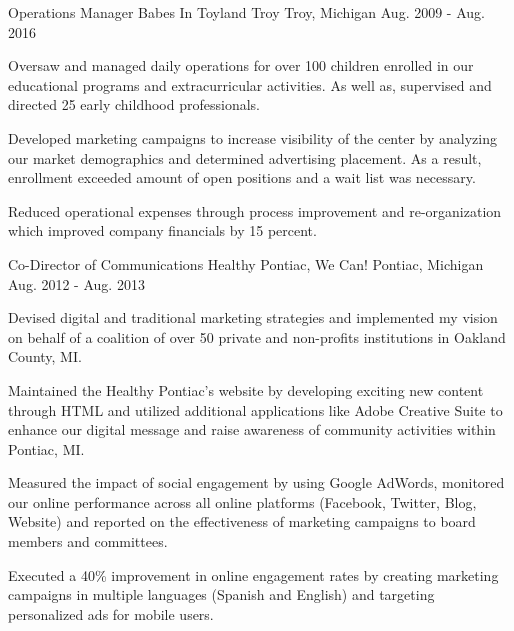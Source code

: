 \begin{cventries}
  \cventry
    {Operations Manager} %
    {Babes In Toyland Troy} %
    {Troy, Michigan} %
    {Aug. 2009 - Aug. 2016} %
    {
      \begin{cvitems} %
        \item {Oversaw and managed daily operations for over 100 children enrolled in our educational programs and extracurricular activities. As well as, supervised and directed 25 early childhood professionals.}
        \item {Developed marketing campaigns to increase visibility of the center by analyzing our market demographics and determined advertising placement. As a result, enrollment exceeded amount of open positions and a wait list was necessary.}
        \item {Reduced operational expenses through process improvement and re-organization which improved company financials by 15 percent.}
      \end{cvitems}
    }

  \cventry
    {Co-Director of Communications} %
    {Healthy Pontiac, We Can!} %
    {Pontiac, Michigan} %
    {Aug. 2012 - Aug. 2013} %
    {
      \begin{cvitems} %
        \item {Devised digital and traditional marketing strategies and implemented my vision on behalf of a coalition of over 50 private and non-profits institutions in Oakland County, MI.}
        \item {Maintained the Healthy Pontiac’s website by developing exciting new content through HTML and utilized additional applications like Adobe Creative Suite to enhance our digital message and raise awareness of community activities within Pontiac, MI.}
        \item {Measured the impact of social engagement by using Google AdWords, monitored our online performance across all online platforms (Facebook, Twitter, Blog, Website)  and reported on the effectiveness of marketing campaigns to board members and committees.}
        \item {Executed a 40\% improvement in online engagement rates by creating marketing campaigns in multiple languages (Spanish and English) and targeting personalized ads for mobile users.}
      \end{cvitems}
    }

\end{cventries}
